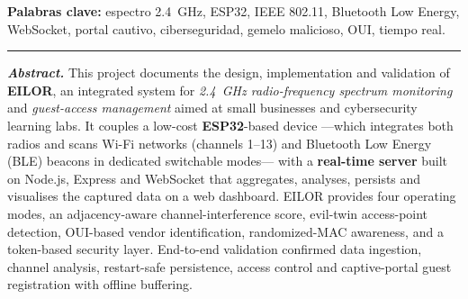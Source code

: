 \vspace{0.6cm}
\noindent\textbf{Palabras clave:} espectro 2.4~GHz, ESP32, IEEE 802.11, Bluetooth Low Energy, WebSocket, portal cautivo, ciberseguridad, gemelo malicioso, OUI, tiempo real.

\vspace{0.4cm}
\hrule
\vspace{0.4cm}

\noindent\textbf{\emph{Abstract.}} This project documents the design, implementation and validation of \textbf{EILOR}, an integrated system for \emph{2.4~GHz radio-frequency spectrum monitoring} and \emph{guest-access management} aimed at small businesses and cybersecurity learning labs. It couples a low-cost \textbf{ESP32}-based device ---which integrates both radios and scans Wi-Fi networks (channels 1--13) and Bluetooth Low Energy (BLE) beacons in dedicated switchable modes--- with a \textbf{real-time server} built on Node.js, Express and WebSocket that aggregates, analyses, persists and visualises the captured data on a web dashboard. EILOR provides four operating modes, an adjacency-aware channel-interference score, evil-twin access-point detection, OUI-based vendor identification, randomized-MAC awareness, and a token-based security layer. End-to-end validation confirmed data ingestion, channel analysis, restart-safe persistence, access control and captive-portal guest registration with offline buffering.
